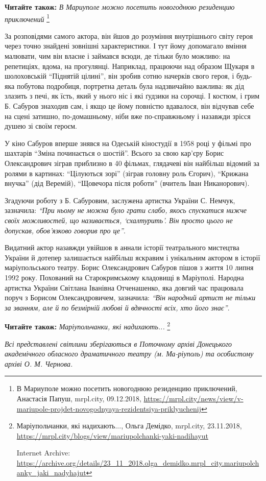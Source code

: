 \textbf{Читайте також:} \emph{В Мариуполе можно посетить новогоднюю резиденцию приключений}%
\footnote{В Мариуполе можно посетить новогоднюю резиденцию приключений, Анастасія Папуш, mrpl.city, 09.12.2018, \url{https://mrpl.city/news/view/v-mariupole-projdet-novogodnyaya-rezidentsiya-priklyuchenij}}


За розповідями самого актора, він йшов до розуміння внутрішнього світу героя
через точно знайдені зовнішні характеристики. І тут йому допомагало вміння
малювати, чим він власне і займався всюди, де тільки було можливо: на
репетиціях, вдома, на прогулянці. Наприклад, працюючи над образом Щукаря в
шолоховській \enquote{Піднятій цілині}, він зробив сотню начерків свого героя,
і будь-яка побутова подробиця, портретна деталь була надзвичайно важлива: як
дід злазить з печі, як їсть, який у нього ніс і які ґудзики на сорочці. І
костюм, і грим Б. Сабуров знаходив сам, і якщо це йому повністю вдавалося, він
відчував себе на сцені затишно, по-домашньому, ніби вже по-справжньому і
назавжди зрісся душею зі своїм героєм.


У кіно Сабуров вперше знявся на Одеській кіностудії в 1958 році у фільмі про
шахтарів \enquote{Зміна починається о шостій}. Всього за свою кар'єру Борис
Олександрович зіграв приблизно в 40 фільмах, глядачеві він найбільш відомий за
ролями в картинах: \enquote{Цілуються зорі} (зіграв головну роль Єгорич), \enquote{Крижана
внучка} (дід Веремій), \enquote{Щовечора після роботи} (вчитель Іван Никанорович).

Згадуючи роботу з Б. Сабуровим, заслужена артистка України С. Немчук,
зазначила: \emph{\enquote{При ньому не можна було грати слабо, якось спускатися нижче своїх
можливостей, що називається, \enquote{схалтурить}. Він просто цього не допускав,
обов'язково говорив про це}}.

Видатний актор назавжди увійшов в аннали історії театрального мистецтва України
й дотепер залишається найбільш яскравим і унікальним актором в історії
маріупольського театру. Борис Олександрович Сабуров пішов з життя 10 липня 1992
року. Похований на Старокримському кладовищі в Маріуполі. Народна артистка
України Світлана Іванівна Отченашенко, яка довгий час працювала поруч з Борисом
Олександровичем, зазначила: \emph{\enquote{Він народний артист не тільки за званням, але й по
безмірній любові й вдячності всіх, хто його знає}}.

\textbf{Читайте також:} \emph{Маріупольчанки, які надихають...}%
\footnote{Маріупольчанки, які надихають..., Ольга Демідко, mrpl.city, 23.11.2018, \url{https://mrpl.city/blogs/view/mariupolchanki-yaki-nadihayut}\par Internet Archive: \url{https://archive.org/details/23_11_2018.olga_demidko.mrpl_city.mariupolchanky_jaki_nadyhajut} }

\emph{Всі представлені світлини зберігаються в Поточному архіві Донецького
академічного обласного драматичного театру (м. Ма\hyp{}ріуполь) та особистому архіві
О. М. Чернова.} 
